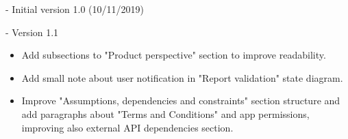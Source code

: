 - Initial version 1.0 (10/11/2019)

- Version 1.1
\begin{itemize}
	\item Add subsections to "Product perspective" section to improve readability.
	\item Add small note about user notification in "Report validation" state diagram. 
	\item Improve "Assumptions, dependencies and constraints" section structure and add paragraphs about "Terms and Conditions" and app permissions, improving also external API dependencies section.
\end{itemize}